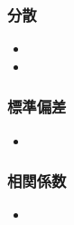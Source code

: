 \documentclass[10pt,dvipdfmx]{jsarticle}
\begin{document}
\subsubsection*{分散}
\begin{Large}
  \begin{itemize}
    \item \item
  \end{itemize}
\end{Large}

\subsubsection*{標準偏差}
\begin{Large}
  \begin{itemize}
    \item
  \end{itemize}
\end{Large}

\subsubsection*{相関係数}
\begin{Large}
  \begin{itemize}
    \item
  \end{itemize}
\end{Large}
\end{document}
